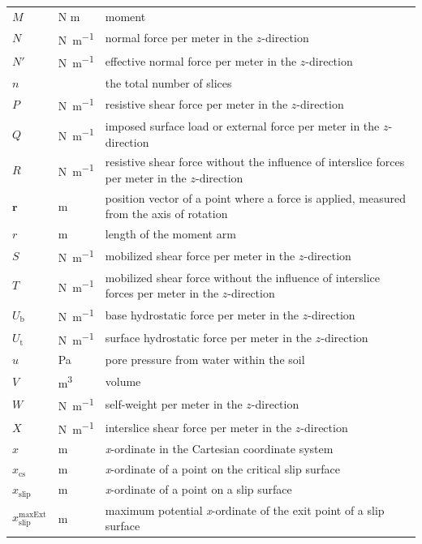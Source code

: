\documentclass[12pt]{article}
\begin{document}
\begin{longtable*}{  l  l  p{8.5cm}  }
$M$ & N \si{\meter}& moment
\\
$N$ & \si{\newton\per\meter} & normal force per meter in the $z$-direction
\\
$N'$ &\si{\newton\per\meter} & effective normal force per meter in the 
$z$-direction
\\
$n$ & & the total number of slices
\\
$P$ & \si{\newton\per\meter} & resistive shear force per meter in the 
$z$-direction
\\
$Q$ & \si{\newton\per\meter} & imposed surface load or external force per meter 
in the $z$-direction
\\
$R$ & \si{\newton\per\meter} & resistive shear force without the influence of 
interslice forces per meter in the $z$-direction
\\
$\textbf{r}$ & \si{\meter} & position vector of a point where a force is 
applied, measured from the axis of rotation
\\
$r$ & \si{\meter} & length of the moment arm
\\ 
$S$ & \si{\newton\per\meter} & mobilized shear force per meter in the 
$z$-direction
\\
$T$ & \si{\newton\per\meter} & mobilized shear force without the influence of 
interslice forces per meter in the $z$-direction
\\
${U_{\text{b}}}$ & \si{\newton\per\meter} & base hydrostatic force per meter in 
the $z$-direction
\\
${U_{\text{t}}}$ & \si{\newton\per\meter} & surface hydrostatic force per meter 
in the $z$-direction
\\
$u$ &\si{\pascal} & pore pressure from water within the soil
\\
$V$ & \si{\cubic\meter} & volume 
\\
$W$ & \si{\newton\per\meter} & self-weight per meter in the $z$-direction
\\
$X$ & \si{\newton\per\meter} & interslice shear force per meter in the 
$z$-direction
\\
$x$ & \si{\meter}& \textit{x}-ordinate in the Cartesian coordinate system
\\
$x_{\text{cs}}$ & \si{\meter} & \textit{x}-ordinate of a point on the critical 
slip 
surface
\\
${x_{\text{slip}}}$ &  \si{\meter}& \textit{x}-ordinate of a point on a slip 
surface
\\
${x_{\text{slip}}^{\text{maxExt}}}$ &  \si{\meter}& maximum potential 
\textit{x}-ordinate of 
the exit point of a slip surface

\end{longtable*}
\end{document}
